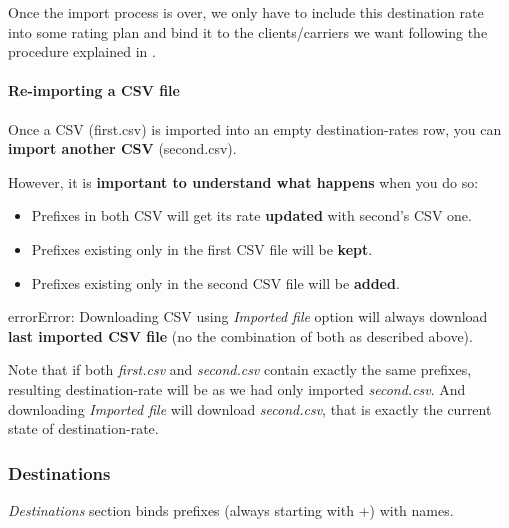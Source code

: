 \documentclass[letterpaper,10pt,spanish]{sphinxmanual}
\begin{document}
Once the import process is over, we only have to include this destination rate into some
rating plan and bind it to the clients/carriers we want following the procedure explained in
{\hyperref[administration_portal/brand/billing/rating_plans:rating\string-plans]{}}.


\paragraph{Re-importing a CSV file}
\label{administration_portal/brand/billing/destination_rates:re-importing-a-csv-file}
Once a CSV (first.csv) is imported into an empty destination-rates row, you can \textbf{import another CSV} (second.csv).

However, it is \textbf{important to understand what happens} when you do so:
\begin{itemize}
\item {} 
Prefixes in both CSV will get its rate \textbf{updated} with second's CSV one.

\item {} 
Prefixes existing only in the first CSV file will be \textbf{kept}.

\item {} 
Prefixes existing only in the second CSV file will be \textbf{added}.

\end{itemize}

\begin{notice}{error}{Error:}
Downloading CSV using \emph{Imported file} option will always download \textbf{last imported CSV file} (no the
combination of both as described above).
\end{notice}

Note that if both \emph{first.csv} and \emph{second.csv} contain exactly the same prefixes, resulting destination-rate will be as
we had only imported \emph{second.csv}. And downloading \emph{Imported file} will download \emph{second.csv}, that is exactly the current
state of destination-rate.


\subsubsection{Destinations}
\label{administration_portal/brand/billing/destinations::doc}\label{administration_portal/brand/billing/destinations:destinations}
\emph{Destinations} section binds prefixes (always starting with +) with names.
\end{document}
